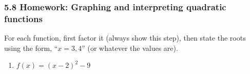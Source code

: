 \documentclass[12pt, twoside]{article}
\begin{document}
    \subsubsection*{5.8 Homework: Graphing and interpreting quadratic functions}

For each function, first factor it (always show this step), then state the roots using the form, ``$x=3,4$'' (or whatever the values are).
\begin{enumerate}


\newpage
\subsubsection*{Completing the square}

Rewrite the function in vertex form, $f(x)=(x-h)^2+k$. Include the step showing the $(-\frac{b}{2a})^2$ term.
     \vspace{6cm}

Expand the function from vertex form to standard form, $ax^2+bx+c \text{ where } a, b, c \;  \epsilon \; \mathbb{R}$. Then factor the result and state the roots. Sketch the function, labeling the intercepts with values and the vertex as an ordered pair.
\item   $f(x)=(x-2)^2-9$
  \begin{flushright}
  \end{flushright}


\end{enumerate}
\end{document}
